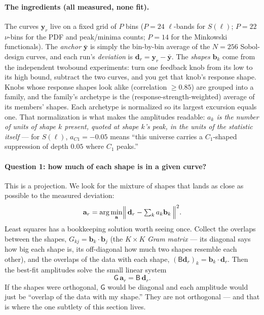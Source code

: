 \paragraph{The ingredients (all measured, none fit).}
The curves $\mathbf{y}_r$ live on a fixed grid of $P$ bins ($P=24$
$\ell$-bands for $S(\ell)$; $P=22$ $\nu$-bins for the PDF and peak/minima
counts; $P=14$ for the Minkowski functionals).  The \emph{anchor}
$\bar{\mathbf{y}}$ is simply the bin-by-bin average of the $N=256$
Sobol-design curves, and each run's \emph{deviation} is
$\mathbf{d}_r=\mathbf{y}_r-\bar{\mathbf{y}}$.  The \emph{shapes}
$\mathbf{b}_k$ come from the independent twobound experiments: turn one
feedback knob from its low to its high bound, subtract the two curves,
and you get that knob's response shape.  Knobs whose response shapes look
alike (correlation $\ge0.85$) are grouped into a family, and the family's
archetype is the (response-strength-weighted) average of its members'
shapes.  Each archetype is normalized so its largest excursion equals
one.  That normalization is what makes the amplitudes readable:
\emph{$a_k$ is the number of units of shape $k$ present, quoted at shape
$k$'s peak, in the units of the statistic itself} --- for $S(\ell)$,
$a_{C1}=-0.05$ means ``this universe carries a $C_1$-shaped suppression
of depth $0.05$ where $C_1$ peaks.''

\paragraph{Question 1: how much of each shape is in a given curve?}
This is a projection.  We look for the mixture of shapes that lands as
close as possible to the measured deviation:
\begin{equation}
\mathbf{a}_r=\arg\min_{\mathbf{a}}
\Bigl\lVert\, \mathbf{d}_r-\textstyle\sum_k a_k \mathbf{b}_k \,\Bigr\rVert^2 .
\label{eq:amp-objective}
\end{equation}
Least squares has a bookkeeping solution worth seeing once.  Collect the
overlaps between the shapes, $G_{kj}=\mathbf{b}_k\!\cdot\!\mathbf{b}_j$
(the $K\times K$ \emph{Gram matrix} --- its diagonal says how big each
shape is, its off-diagonal how much two shapes resemble each other), and
the overlaps of the data with each shape,
$(\mathsf{B}\mathbf{d}_r)_k=\mathbf{b}_k\!\cdot\!\mathbf{d}_r$.  Then the
best-fit amplitudes solve the small linear system
\begin{equation}
\mathsf{G}\,\mathbf{a}_r=\mathsf{B}\,\mathbf{d}_r .
\label{eq:normal-eq}
\end{equation}
If the shapes were orthogonal, $\mathsf{G}$ would be diagonal and each
amplitude would just be ``overlap of the data with my shape.''  They are
not orthogonal --- and that is where the one subtlety of this section
lives.

